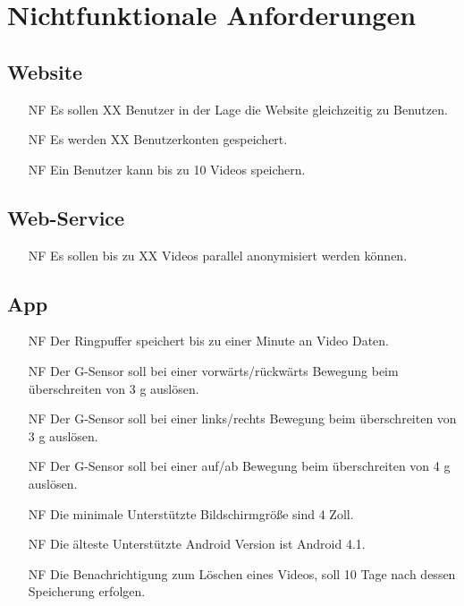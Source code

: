 \section{Nichtfunktionale Anforderungen}

\subsection{Website}
\begin{itemize}
\item[NF] Es sollen XX Benutzer in der Lage die Website gleichzeitig zu Benutzen.

\item[NF] Es werden XX Benutzerkonten gespeichert.

\item[NF] Ein Benutzer kann bis zu 10 Videos speichern.
\end{itemize}

\subsection{Web-Service}
\begin{itemize}
\item[NF] Es sollen bis zu XX Videos parallel anonymisiert werden können.
\end{itemize}

\subsection{App}
\begin{itemize}
\item[NF] Der Ringpuffer speichert bis zu einer Minute an Video Daten.

\item[NF] Der G-Sensor soll bei einer vorwärts/rückwärts Bewegung beim überschreiten von 3 g auslösen.

\item[NF] Der G-Sensor soll bei einer links/rechts Bewegung beim überschreiten von 3 g auslösen.

\item[NF] Der G-Sensor soll bei einer auf/ab Bewegung beim überschreiten von 4 g auslösen.

\item[NF] Die minimale Unterstützte Bildschirmgröße sind 4 Zoll.

\item[NF] Die älteste Unterstützte Android Version ist Android 4.1.

\item[NF] Die Benachrichtigung zum Löschen eines Videos, soll 10 Tage nach dessen Speicherung erfolgen.
\end{itemize}

